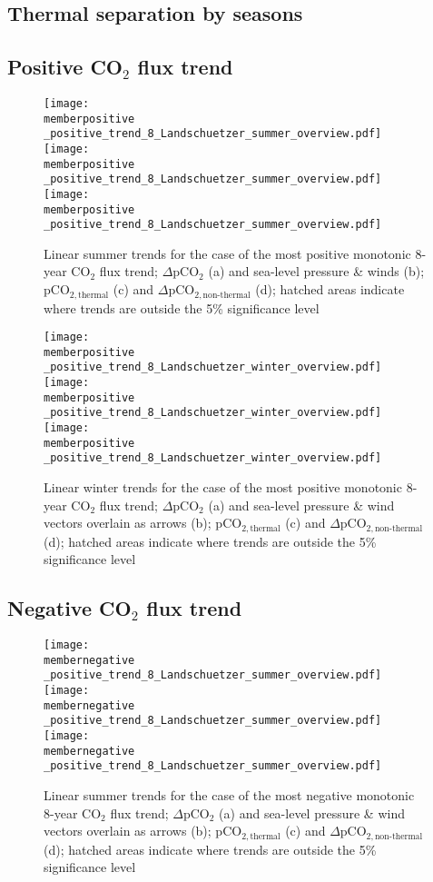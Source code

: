 \documentclass[12pt]{article}
\newcommand{\memberpositive}{m178_1985_1992} %
\newcommand{\membernegative}{m143_1995_2002}
\begin{document}
\clearpage
\subsection{Thermal separation by seasons}
\subsection{Positive CO$_2$ flux trend}
\begin{figure}[h!]
\centering
	\texttt{[image: \\memberpositive \_positive\_trend\_8\_Landschuetzer\_summer\_overview.pdf]}
	\texttt{[image: \\memberpositive \_positive\_trend\_8\_Landschuetzer\_summer\_overview.pdf]}	
	\texttt{[image: \\memberpositive \_positive\_trend\_8\_Landschuetzer\_summer\_overview.pdf]}
	\caption{Linear summer trends for the case of the most positive monotonic 8-year CO$_2$ flux trend; $\Delta$pCO$_2$ (a) and sea-level pressure \& winds (b); pCO$_{2,\text{thermal}}$ (c) and $\Delta$pCO$_{2,\text{non-thermal}}$ (d); hatched areas indicate where trends are outside the 5\% significance level}
	\label{fig:thermal_pos_summer}
\end{figure}

\begin{figure}[h!]
\centering
	\texttt{[image: \\memberpositive \_positive\_trend\_8\_Landschuetzer\_winter\_overview.pdf]}
	\texttt{[image: \\memberpositive \_positive\_trend\_8\_Landschuetzer\_winter\_overview.pdf]}	
	\texttt{[image: \\memberpositive \_positive\_trend\_8\_Landschuetzer\_winter\_overview.pdf]}
	\caption{Linear winter trends for the case of the most positive monotonic 8-year CO$_2$ flux trend; $\Delta$pCO$_2$ (a) and sea-level pressure \& wind vectors overlain as arrows (b); pCO$_{2,\text{thermal}}$ (c) and $\Delta$pCO$_{2,\text{non-thermal}}$ (d); hatched areas indicate where trends are outside the 5\% significance level}
	\label{fig:thermal_pos_winter}
\end{figure}

\clearpage
\subsection{Negative CO$_2$ flux trend}
\begin{figure}[h!]
\centering
	\texttt{[image: \\membernegative \_positive\_trend\_8\_Landschuetzer\_summer\_overview.pdf]}
	\texttt{[image: \\membernegative \_positive\_trend\_8\_Landschuetzer\_summer\_overview.pdf]}	
	\texttt{[image: \\membernegative \_positive\_trend\_8\_Landschuetzer\_summer\_overview.pdf]}
	\caption{Linear summer trends for the case of the most negative monotonic 8-year CO$_2$ flux trend; $\Delta$pCO$_2$ (a) and sea-level pressure \& wind vectors overlain as arrows (b); pCO$_{2,\text{thermal}}$ (c) and $\Delta$pCO$_{2,\text{non-thermal}}$ (d); hatched areas indicate where trends are outside the 5\% significance level}
	\label{fig:thermal_neg_summer}
\end{figure}
\end{document}
